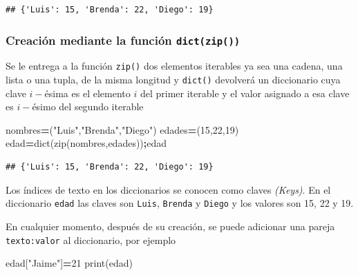\documentclass[
]{book}
\newenvironment{Shaded}{\begin{snugshade}}{\end{snugshade}}
\newcommand{\BuiltInTok}[1]{#1}
\newcommand{\DecValTok}[1]{\textcolor[rgb]{0.00,0.00,0.81}{#1}}
\newcommand{\NormalTok}[1]{#1}
\newcommand{\OperatorTok}[1]{\textcolor[rgb]{0.81,0.36,0.00}{\textbf{#1}}}
\newcommand{\StringTok}[1]{\textcolor[rgb]{0.31,0.60,0.02}{#1}}
\theoremstyle{definition}
\theoremstyle{definition}
\theoremstyle{definition}
\theoremstyle{definition}
\theoremstyle{remark}
\begin{document}
\begin{verbatim}
## {'Luis': 15, 'Brenda': 22, 'Diego': 19}
\end{verbatim}

\hypertarget{creaciuxf3n-mediante-la-funciuxf3n-dictzip}{%
\subsubsection{\texorpdfstring{Creación mediante la función \texttt{dict(zip())}}{Creación mediante la función dict(zip())}}\label{creaciuxf3n-mediante-la-funciuxf3n-dictzip}}

Se le entrega a la función \texttt{zip()} dos elementos iterables ya sea una cadena, una lista o una tupla, de la misma longitud y \texttt{dict()} devolverá un diccionario cuya clave \(i-\)ésima es el elemento \(i\) del primer iterable y el valor asignado a esa clave es \(i-\)ésimo del segundo iterable

\begin{Shaded}
\begin{Highlighting}[]
\NormalTok{nombres}\OperatorTok{=}\NormalTok{(}\StringTok{"Luis"}\NormalTok{,}\StringTok{"Brenda"}\NormalTok{,}\StringTok{"Diego"}\NormalTok{)}
\NormalTok{edades}\OperatorTok{=}\NormalTok{(}\DecValTok{15}\NormalTok{,}\DecValTok{22}\NormalTok{,}\DecValTok{19}\NormalTok{)}
\NormalTok{edad}\OperatorTok{=}\BuiltInTok{dict}\NormalTok{(}\BuiltInTok{zip}\NormalTok{(nombres,edades))}\OperatorTok{;}\NormalTok{edad}
\end{Highlighting}
\end{Shaded}

\begin{verbatim}
## {'Luis': 15, 'Brenda': 22, 'Diego': 19}
\end{verbatim}

Los índices de texto en los diccionarios se conocen como claves \emph{(Keys)}. En el diccionario \texttt{edad} las claves son \texttt{\textquotesingle{}Luis\textquotesingle{}}, \texttt{\textquotesingle{}Brenda\textquotesingle{}} y \texttt{\textquotesingle{}Diego\textquotesingle{}} y los valores son 15, 22 y 19.

En cualquier momento, después de su creación, se puede adicionar una pareja \texttt{texto:valor} al diccionario, por ejemplo

\begin{Shaded}
\begin{Highlighting}[]
\NormalTok{edad[}\StringTok{"Jaime"}\NormalTok{]}\OperatorTok{=}\DecValTok{21} 
\BuiltInTok{print}\NormalTok{(edad)}
\end{Highlighting}
\end{Shaded}
\end{document}
